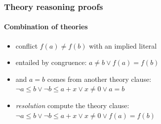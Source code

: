 \documentclass[svgnames,table,mathserif]{beamer}
\begin{document}

\begin{frame}
  \frametitle{Theory reasoning proofs}
  \framesubtitle{Combination of theories}

{\small
\begin{itemize}
\item<1-> conflict $f(a) \neq f(b)$ with an implied literal
\item<2-> entailed by congruence: $a \neq b \vee f(a) = f(b)$
\item<3-> and $a = b$ comes from another theory clause: $\neg a \leq b \vee \neg b \leq a + x \vee x \neq 0 \vee a = b$
\item<4-> \emph{resolution} compute the theory clause: $\neg a \leq b \vee \neg b \leq a + x \vee x \neq 0 \vee f(a) = f(b)$
\end{itemize}}


\end{frame}

\end{document}
